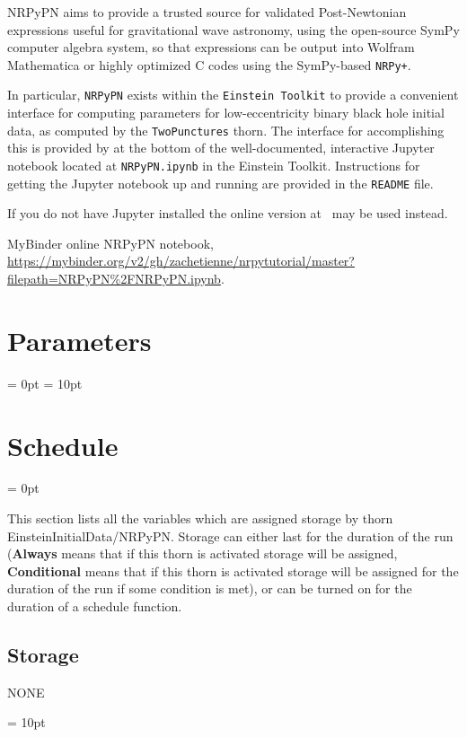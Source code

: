 NRPyPN aims to provide a trusted source for validated
Post-Newtonian expressions useful for gravitational wave astronomy,
using the open-source SymPy computer algebra
system, so that expressions can be output into Wolfram
Mathematica or highly optimized C codes using the SymPy-based
\texttt{NRPy+}.

In particular, \texttt{NRPyPN} exists within the \texttt{Einstein
  Toolkit} to provide a convenient interface for computing
parameters for low-eccentricity binary black hole initial data, as
computed by the \texttt{TwoPunctures} thorn. The interface for
accomplishing this is provided by at the bottom of the
well-documented, interactive Jupyter notebook located at
\texttt{NRPyPN.ipynb} in the Einstein Toolkit. Instructions for
getting the Jupyter notebook up and running are provided in the
\texttt{README} file.

If you do not have Jupyter installed the online version
at~\cite{EinsteinInitialData_NRPyPN_MyBinder} may be used instead.

\begin{thebibliography}{9}

MyBinder online NRPyPN notebook,
\url{https://mybinder.org/v2/gh/zachetienne/nrpytutorial/master?filepath=NRPyPN%2FNRPyPN.ipynb}.

\end{thebibliography}





\section{Parameters} 


\parskip = 0pt
\parskip = 10pt 

\section{Schedule} 


\parskip = 0pt


\noindent This section lists all the variables which are assigned storage by thorn EinsteinInitialData/NRPyPN.  Storage can either last for the duration of the run ({\bf Always} means that if this thorn is activated storage will be assigned, {\bf Conditional} means that if this thorn is activated storage will be assigned for the duration of the run if some condition is met), or can be turned on for the duration of a schedule function.


\subsection*{Storage}NONE

\vspace{5mm}\parskip = 10pt 

